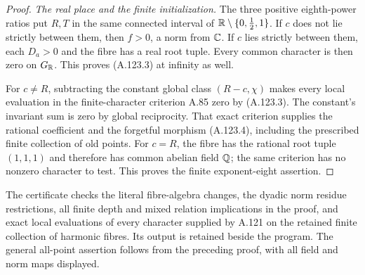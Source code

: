 \begin{proof}
\emph{The real place and the finite initialization.}
The three positive eighth-power ratios put $R,T$
in the same connected interval of
$\mathbb R\setminus\{0,\tfrac12,1\}$.
If $c$ does not lie strictly between them, then
$f>0$, a norm from $\mathbb C$.
If $c$ lies strictly between them, each $D_a>0$
and the fibre has a real root tuple.
Every common character is then zero on $G_\mathbb R$.
This proves (A.123.3) at infinity as well.

For $c\ne R$, subtracting the constant global
class $(R-c,\chi)$ makes every local evaluation
in the finite-character criterion A.85 zero by
(A.123.3).
The constant's invariant sum is zero by global
reciprocity.
That exact criterion supplies the rational
coefficient and the forgetful morphism (A.123.4),
including the prescribed finite collection of
old points.
For $c=R$, the fibre has the rational root tuple
$(1,1,1)$ and therefore has common abelian field
$\mathbb Q$; the same criterion has no nonzero character
to test.
This proves the finite exponent-eight assertion.
\end{proof}

The certificate
checks the literal fibre-algebra changes, the dyadic
norm residue restrictions, all finite depth and mixed
relation implications in the proof, and exact local
evaluations of every character supplied by A.121 on
the retained finite collection of harmonic fibres.
Its output is retained beside the program.
The general all-point assertion follows from the
preceding proof, with all field and norm maps displayed.

